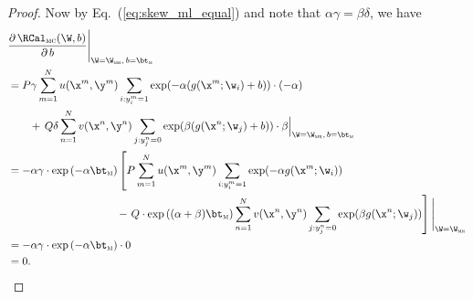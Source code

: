 \begin{proof}
Now by Eq.~(\ref{eq:skew_ml_equal}) and note that $\alpha \gamma = \beta \delta$, we have
\begin{equation}
\label{eq:grad_mc_bias}
\begin{aligned}
&  \frac{\partial \, \RCal_\textsc{mc}(\W, b)} {\partial \, b} 
   \Bigg|_{\W = \W_\textsc{mr}, \, b = \bt_\textsc{m}} \\
&= P \gamma \sum_{m=1}^N u(\x^m, \y^m) \sum_{i: y_i^m = 1} \exp(-\alpha (g(\x^m; \w_i) + b)) \cdot (-\alpha) \\
&  \hspace{2em} + \,
   Q \delta \sum_{n=1}^N v(\x^n, \y^n) \sum_{j: y_j^n = 0} \exp( \beta  (g(\x^n; \w_j) + b)) \cdot \beta 
   \Big|_{\W = \W_\textsc{mr}, \, b = \bt_\textsc{m}} \\
&= -\alpha \gamma \cdot \exp \left( -\alpha \bt_\textsc{m} \right) \left[
   P \sum_{m=1}^N u(\x^m, \y^m) \sum_{i: y_i^m = 1} \exp(-\alpha g(\x^m; \w_i)) \right. \\
&  \hspace{10em} - \left.
   Q \cdot \exp \left( (\alpha + \beta) \bt_\textsc{m} \right)
     \sum_{n=1}^N v(\x^n, \y^n) \sum_{j: y_j^n = 0} \exp( \beta  g(\x^n; \w_j)) \right] 
   \Bigg|_{\W = \W_\textsc{mr}} \\
&= -\alpha \gamma \cdot \exp \left( -\alpha \bt_\textsc{m} \right) \cdot 0 \\
&= 0.
\end{aligned}
\end{equation}


\end{proof}
